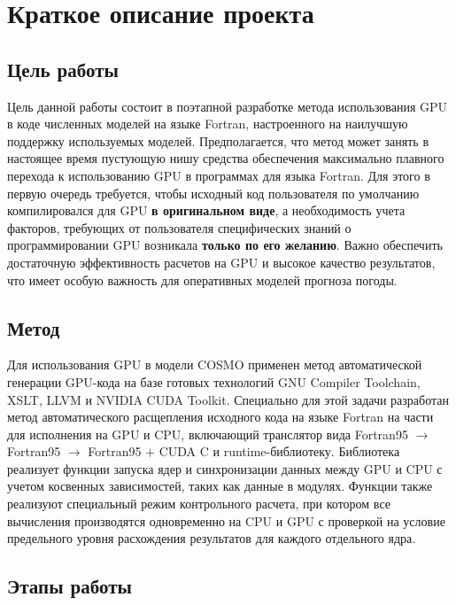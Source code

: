 \documentclass[a4,12pt]{report}
\begin{document}
\chapter{Краткое описание проекта}

\section{Цель работы}

Цель данной работы состоит в поэтапной разработке метода использования GPU в коде численных моделей на языке Fortran, настроенного на наилучшую поддержку используемых моделей. Предполагается, что метод может занять в настоящее время пустующую нишу средства обеспечения максимально плавного перехода к использованию GPU в программах для языка Fortran. Для этого в первую очередь требуется, чтобы исходный код пользователя по умолчанию компилировался для GPU \textbf{в оригинальном виде}, а необходимость учета факторов, требующих от пользователя специфических знаний о программировании GPU возникала \textbf{только по его желанию}. Важно обеспечить достаточную эффективность расчетов на GPU и высокое качество результатов, что имеет особую важность для оперативных моделей прогноза погоды.

\section{Метод}

Для использования GPU в модели COSMO применен метод автоматической генерации GPU-кода на базе готовых технологий GNU Compiler Toolchain, XSLT, LLVM и NVIDIA CUDA Toolkit. Специально для этой задачи разработан метод автоматического расщепления исходного кода на языке Fortran на части для исполнения на GPU и CPU, включающий транслятор вида Fortran95 $\rightarrow$ Fortran95 $\rightarrow$ Fortran95 $+$ CUDA C и runtime-библиотеку. Библиотека реализует функции запуска ядер и синхронизации данных между GPU и CPU с учетом косвенных зависимостей, таких как данные в модулях. Функции также реализуют специальный режим контрольного расчета, при котором все вычисления производятся одновременно на CPU и GPU с проверкой на условие предельного уровня расхождения результатов для каждого отдельного ядра.

\section{Этапы работы}
\end{document}
